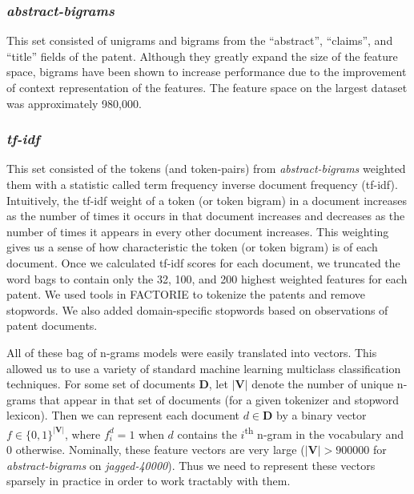 \subsubsection{\emph{abstract-bigrams}}
This set consisted of unigrams and bigrams from the ``abstract'', ``claims'', and ``title'' fields of the patent.  Although they greatly expand the size of the feature space, bigrams have been shown to increase performance due to the improvement of context representation of the features.  The feature space on the largest dataset was approximately 980,000.
\subsubsection{\emph{tf-idf}}
This set consisted of the tokens (and token-pairs) from \emph{abstract-bigrams} weighted them with a statistic called term frequency inverse document frequency (tf-idf)\cite{manning:2008:IR}. Intuitively, the tf-idf weight of a token (or token bigram) in a document increases as the number of times it occurs in that document increases and decreases as the number of times it appears in every other document increases. This weighting gives us a sense of how characteristic the token (or token bigram) is of each document. Once we calculated tf-idf scores for each document, we truncated the word bags to contain only the 32, 100, and 200 highest weighted features for each patent. We used tools in FACTORIE\cite{mccallum09:factorie:} to tokenize the patents and remove stopwords. We also added domain-specific stopwords based on observations of patent documents. 

All of these bag of n-grams models were easily translated into vectors. This allowed us to use a variety of standard machine learning multiclass classification techniques. For some set of documents $\mathbf{D}$, let $| \mathbf{V} |$ denote the number of unique n-grams that appear in that set of documents (for a given tokenizer and stopword lexicon). Then we can represent each document $ d \in \mathbf{D}$ by a binary vector $f \in \{0,1\}^{| \mathbf{V} |}$, where $f^d_i = 1$ when $d$ contains the $i$\textsuperscript{th} n-gram in the vocabulary and 0 otherwise. Nominally, these feature vectors are very large ($| \mathbf{V} | > 900000$ for \emph{abstract-bigrams} on \emph{jagged-40000}). Thus we need to represent these vectors sparsely in practice in order to work tractably with them.


